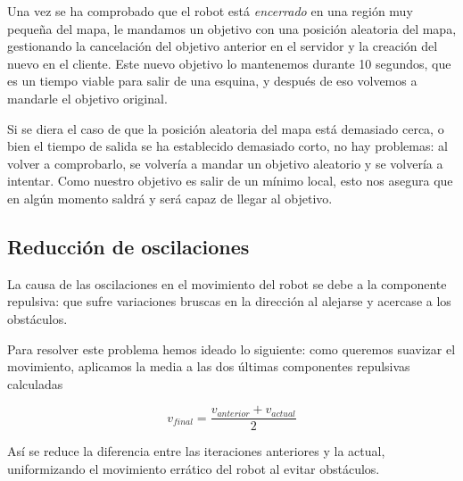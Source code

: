 \documentclass[a4paper, 11pt, titlepage]{article}
\begin{document}
    Una vez se ha comprobado que el robot está \emph{encerrado} en una región muy pequeña del mapa, le mandamos un objetivo con una posición aleatoria del mapa, gestionando la cancelación del objetivo anterior en el servidor y la creación del nuevo en el cliente. Este nuevo objetivo lo mantenemos durante 10 segundos, que es un tiempo viable para salir de una esquina, y después de eso volvemos a mandarle el objetivo original.

    Si se diera el caso de que la posición aleatoria del mapa está demasiado cerca, o bien el tiempo de salida se ha establecido demasiado corto, no hay problemas: al volver a comprobarlo, se volvería a mandar un objetivo aleatorio y se volvería a intentar. Como nuestro objetivo es salir de un mínimo local, esto nos asegura que en algún momento saldrá y será capaz de llegar al objetivo.

  \subsection{Reducción de oscilaciones}
    La causa de las oscilaciones en el movimiento del robot se debe a la componente repulsiva: que sufre variaciones bruscas en la dirección al alejarse y acercase a los obstáculos.

    Para resolver este problema hemos ideado lo siguiente: como queremos suavizar el movimiento, aplicamos la media a las dos últimas componentes repulsivas calculadas

    $$ v_{final} = \frac{v_{anterior} + v_{actual}}{2}$$


    Así se reduce la diferencia entre las iteraciones anteriores y la actual, uniformizando el movimiento errático del robot al evitar obstáculos.
\end{document}
